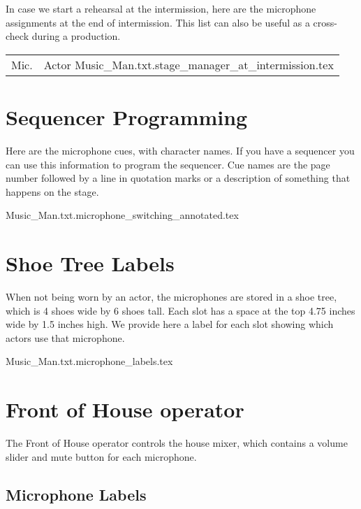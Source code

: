 \documentclass[letterpaper]{article}
\begin{document}
In case we start a rehearsal at the intermission, here are the microphone
assignments at the end of intermission.  This list can also be useful as a 
cross-check during a production.

\begin{center}
\begin{longtable}{|l|l|}
\hline Mic. & Actor \endhead \hline
 {Music_Man.txt.stage_manager_at_intermission.tex}
\end{longtable}
\end{center}

\section {Sequencer Programming}

Here are the microphone cues, with character names.  If you
have a sequencer you can use this information to program
the sequencer.  Cue names are the page number followed by a line
in quotation marks or a description of something that happens on
the stage.

 {Music_Man.txt.microphone_switching_annotated.tex}

\section {Shoe Tree Labels}

When not being worn by an actor, the microphones are stored in a shoe tree,
which is 4 shoes wide by 6 shoes tall.  
Each slot has a space at the top 4.75 inches wide
by 1.5 inches high.  We provide here a label for each slot showing which
actors use that microphone.

{\Large
 {Music_Man.txt.microphone_labels.tex}
}

\section {Front of House operator}

The Front of House operator controls the house mixer, 
which contains a volume slider
and mute button for each microphone.  

\subsection {Microphone Labels}
\end{document}
